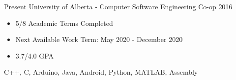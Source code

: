 
  

\begin{experiences}
    \experience
      {Present}   {University of Alberta - Computer Software Engineering Co-op}{}{}
      {2016} {
                        \begin{itemize}
                          \item 5/8 Academic Terms Completed
                          \item Next Available Work Term: May 2020 - December 2020
			  \item 3.7/4.0 GPA
                        \end{itemize}
                      }
                      {
                        C++,
                        C,
                        Arduino,
                        Java,
                        Android,
                        Python,
                        MATLAB,
                        Assembly
                      }
  
  \end{experiences}
